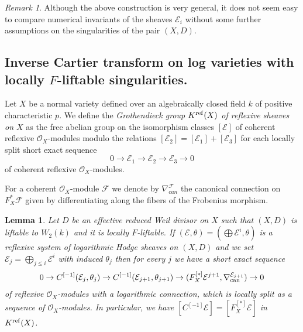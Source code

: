 \documentclass[12pt]{article}
\theoremstyle{plain}
\newtheorem{Lemma}[Thm]{\sc Lemma}
\theoremstyle{definition}
\theoremstyle{remark}
\newtheorem{Remark}[Thm]{Remark}
\newcommand{\cE}{{\mathcal E}}
\newcommand{\cF}{{\mathcal F}}
\newcommand{\cO}{{\mathcal O}}
\newcommand{\can}{{\mathop{\rm can}}}
\newcommand{\refl}{{\mathop{\operatorname{\rm ref} }}}
\begin{document}
\begin{Remark}
Although the above construction is very general, it does not seem easy to compare numerical invariants of 
the sheaves $\cE_i$ without some further assumptions on the singularities of the pair $(X,D)$.
\end{Remark}


\subsection{Inverse Cartier transform on log varieties with  locally $F$-liftable singularities.}

Let $X$ be a normal variety defined over an algebraically closed field $k$ of positive characteristic $p$.
We define the \emph{Grothendieck group $K^{\refl }(X)$  of reflexive sheaves on $X$} as 
the free abelian group on the isomorphism classes $[\cE]$ of coherent reflexive $\cO_X$-modules modulo
the relations $[\cE_2]=[\cE_1]+[\cE_3]$ for each locally split short exact sequence
$$0\to \cE_1\to \cE_2\to \cE_3\to 0$$
of coherent reflexive $\cO_X$-modules.

For a coherent $\cO_X$-module $\cF$ we denote by
$\nabla_{can}^{\cF}$ the canonical connection on $F_X^*\cF$ given by differentiating along the fibers of the Frobenius morphism.

\begin{Lemma}\label{classes-Cartier-transform}
Let $D$ be an effective reduced Weil divisor on $X$ such that $(X, D)$ is liftable to $W_2(k)$ and it is locally $F$-liftable.
If $(\cE, \theta)= (\bigoplus \cE^i, \theta)$ is a reflexive system of  logarithmic Hodge sheaves on $(X, D)$
and we set $\cE_j =\bigoplus _{j\le i}\cE^i$ with induced $\theta _j$ then for every $j$ we have  a short exact sequence
$$0\to C^{[-1]} (\cE _j, \theta _j)\to C^{[-1]} (\cE _{j+1}, \theta _{j+1})\to (F_X^{[*]}\cE^{j+1},\nabla_{\can}^{\cE_{j+1}})\to 0$$
of reflexive $\cO_X$-modules with a logarithmic connection, 
which is locally split as a sequence of $\cO_X$-modules. In particular, we have
$[C^{[-1]}\cE]=[F_X^{[*]}\cE]$
in $K^{\refl }(X)$.
\end{Lemma}
\end{document}
